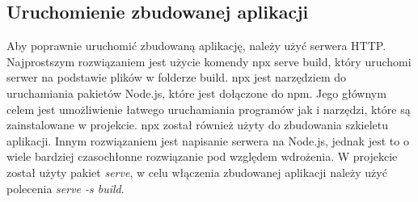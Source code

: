 \subsection*{Uruchomienie zbudowanej aplikacji}
Aby poprawnie uruchomić zbudowaną aplikację, należy użyć serwera HTTP. Najprostszym rozwiązaniem jest użycie komendy npx serve build, który uruchomi serwer na podstawie plików w folderze build. npx jest narzędziem do uruchamiania pakietów Node.js, które jest dołączone do npm. Jego głównym celem jest umożliwienie łatwego uruchamiania programów jak i narzędzi, które są zainstalowane w projekcie. npx został również użyty do zbudowania szkieletu aplikacji. Innym rozwiązaniem jest napisanie serwera na Node.js, jednak jest to o wiele bardziej czasochłonne rozwiązanie pod względem wdrożenia. W projekcie został użyty pakiet \textit{serve}, w celu włączenia zbudowanej aplikacji należy użyć polecenia \textit{serve -s build}.